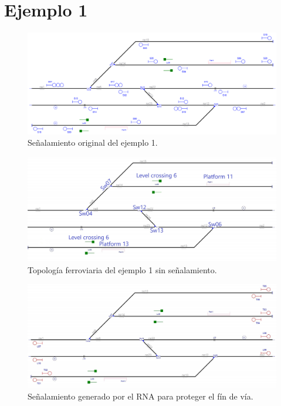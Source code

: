 \section{Ejemplo 1}

    \lipsum[1]

    \begin{figure}[h]
        \centering
        \includegraphics[width=1\textwidth]{resultados-obtenidos/ejemplo1/images/1_original.png}
        \centering\caption{Señalamiento original del ejemplo 1.}
    \end{figure}

    \begin{figure}[h]
        \centering
        \includegraphics[width=1\textwidth]{resultados-obtenidos/ejemplo1/images/1_empty.png}
        \centering\caption{Topología ferroviaria del ejemplo 1 sin señalamiento.}
    \end{figure}

    \begin{figure}[h]
        \centering
        \includegraphics[width=1\textwidth]{resultados-obtenidos/ejemplo1/images/1_step1.png}
        \centering\caption{Señalamiento generado por el RNA para proteger el fín de vía.}
    \end{figure}

